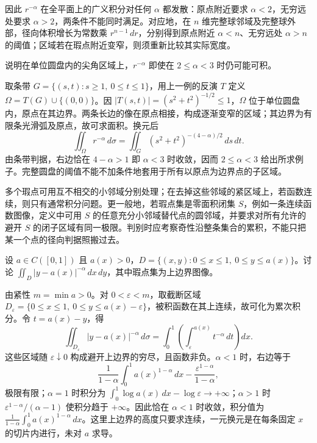 \documentclass[UTF8,12pt,a4paper,fontset=fandol]{ctexbook}
\begin{document}
因此 $r^{-\alpha}$ 在全平面上的广义积分对任何 $\alpha$ 都发散：原点附近要求 $\alpha<2$，无穷远处要求 $\alpha>2$，两条件不能同时满足。对应地，在 $n$ 维完整球邻域及完整球外部，径向体积增长为常数乘 $r^{n-1}\,dr$，分别得到原点附近 $\alpha<n$、无穷远处 $\alpha>n$ 的阈值；区域若在瑕点附近变窄，则须重新比较其实际宽度。

\begin{example}
\label{ex:multiple-singular-thin-domain}
说明在单位圆盘内的尖角区域上，$r^{-\alpha}$ 即使在 $2\leq\alpha<3$ 时仍可能可积。
\end{example}
\begin{solve}
取条带 $G=\{(s,t):s\geq1,\ 0\leq t\leq1\}$，用上一例的反演 $T$ 定义 $\Omega=T(G)\cup\{(0,0)\}$。因 $|T(s,t)|=(s^2+t^2)^{-1/2}\leq1$，$\Omega$ 位于单位圆盘内，原点在其边界。两条长边的像在原点相接，构成逐渐变窄的区域；其边界为有限条光滑弧及原点，故可求面积。换元后
\[
    \iint_\Omega r^{-\alpha}\,d\sigma
    =\iint_G(s^2+t^2)^{-(4-\alpha)/2}\,ds\,dt.
\]
由条带判据，右边恰在 $4-\alpha>1$ 即 $\alpha<3$ 时收敛，因而 $2\leq\alpha<3$ 给出所求例子。完整圆盘的阈值不能不加条件地套用于所有以原点为边界点的子区域。
\end{solve}

多个瑕点可用互不相交的小邻域分别处理；在去掉这些邻域的紧区域上，若函数连续，则只有通常积分问题。更一般地，若瑕点集是零面积闭集 $S$，例如一条连续函数图像，定义中可用 $S$ 的任意充分小邻域替代点的圆邻域，并要求对所有允许的避开 $S$ 的闭子区域有同一极限。判别时应考察奇性沿整条集合的累积，不能只把某一个点的径向判据照搬过去。

\begin{example}
\label{ex:multiple-singular-curve}
设 $a\in C([0,1])$ 且 $a(x)>0$，$D=\{(x,y):0\leq x\leq1,\ 0\leq y\leq a(x)\}$。讨论 $\displaystyle\iint_D|y-a(x)|^{-\alpha}\,dx\,dy$，其中瑕点集为上边界图像。
\end{example}
\begin{solve}
由紧性 $m=\min a>0$。对 $0<\varepsilon<m$，取截断区域 $D_\varepsilon=\{0\leq x\leq1,\ 0\leq y\leq a(x)-\varepsilon\}$，被积函数在其上连续，故可化为累次积分。令 $t=a(x)-y$，得
\[
    \iint_{D_\varepsilon}|y-a(x)|^{-\alpha}\,d\sigma
    =\int_0^1\left(\int_\varepsilon^{a(x)}t^{-\alpha}\,dt\right)dx.
\]
这些区域随 $\varepsilon\downarrow0$ 构成避开上边界的穷尽，且函数非负。$\alpha<1$ 时，右边等于
\[
    \frac1{1-\alpha}\int_0^1a(x)^{1-\alpha}\,dx
    -\frac{\varepsilon^{1-\alpha}}{1-\alpha},
\]
极限有限；$\alpha=1$ 时积分为 $\int_0^1\log a(x)\,dx-\log\varepsilon\to+\infty$；$\alpha>1$ 时 $\varepsilon^{1-\alpha}/(\alpha-1)$ 使积分趋于 $+\infty$。因此恰在 $\alpha<1$ 时收敛，积分值为 $\frac1{1-\alpha}\int_0^1a(x)^{1-\alpha}\,dx$。这里上边界的高度只要求连续，一元换元是在每条固定 $x$ 的切片内进行，未对 $a$ 求导。
\end{solve}
\end{document}
